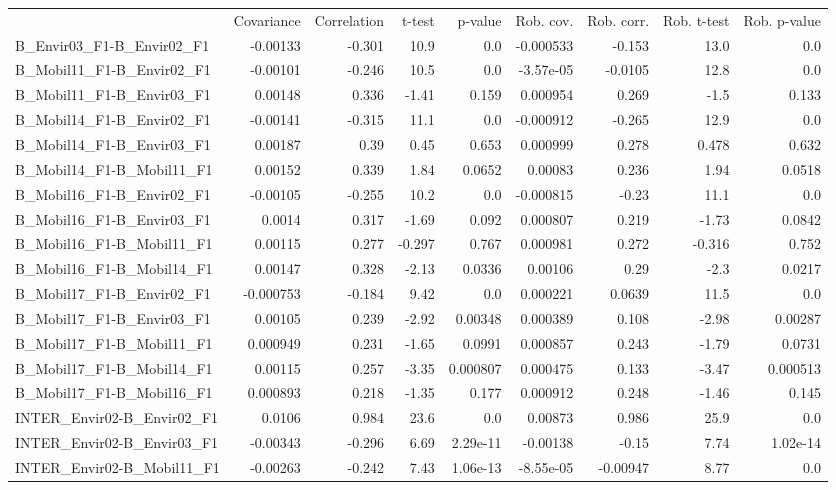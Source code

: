 \begin{tabular}{lrrrrrrrr}
 & Covariance & Correlation & t-test & p-value & Rob. cov. & Rob. corr. & Rob. t-test & Rob. p-value \\
B_Envir03_F1-B_Envir02_F1 & -0.00133 & -0.301 & 10.9 & 0.0 & -0.000533 & -0.153 & 13.0 & 0.0 \\
B_Mobil11_F1-B_Envir02_F1 & -0.00101 & -0.246 & 10.5 & 0.0 & -3.57e-05 & -0.0105 & 12.8 & 0.0 \\
B_Mobil11_F1-B_Envir03_F1 & 0.00148 & 0.336 & -1.41 & 0.159 & 0.000954 & 0.269 & -1.5 & 0.133 \\
B_Mobil14_F1-B_Envir02_F1 & -0.00141 & -0.315 & 11.1 & 0.0 & -0.000912 & -0.265 & 12.9 & 0.0 \\
B_Mobil14_F1-B_Envir03_F1 & 0.00187 & 0.39 & 0.45 & 0.653 & 0.000999 & 0.278 & 0.478 & 0.632 \\
B_Mobil14_F1-B_Mobil11_F1 & 0.00152 & 0.339 & 1.84 & 0.0652 & 0.00083 & 0.236 & 1.94 & 0.0518 \\
B_Mobil16_F1-B_Envir02_F1 & -0.00105 & -0.255 & 10.2 & 0.0 & -0.000815 & -0.23 & 11.1 & 0.0 \\
B_Mobil16_F1-B_Envir03_F1 & 0.0014 & 0.317 & -1.69 & 0.092 & 0.000807 & 0.219 & -1.73 & 0.0842 \\
B_Mobil16_F1-B_Mobil11_F1 & 0.00115 & 0.277 & -0.297 & 0.767 & 0.000981 & 0.272 & -0.316 & 0.752 \\
B_Mobil16_F1-B_Mobil14_F1 & 0.00147 & 0.328 & -2.13 & 0.0336 & 0.00106 & 0.29 & -2.3 & 0.0217 \\
B_Mobil17_F1-B_Envir02_F1 & -0.000753 & -0.184 & 9.42 & 0.0 & 0.000221 & 0.0639 & 11.5 & 0.0 \\
B_Mobil17_F1-B_Envir03_F1 & 0.00105 & 0.239 & -2.92 & 0.00348 & 0.000389 & 0.108 & -2.98 & 0.00287 \\
B_Mobil17_F1-B_Mobil11_F1 & 0.000949 & 0.231 & -1.65 & 0.0991 & 0.000857 & 0.243 & -1.79 & 0.0731 \\
B_Mobil17_F1-B_Mobil14_F1 & 0.00115 & 0.257 & -3.35 & 0.000807 & 0.000475 & 0.133 & -3.47 & 0.000513 \\
B_Mobil17_F1-B_Mobil16_F1 & 0.000893 & 0.218 & -1.35 & 0.177 & 0.000912 & 0.248 & -1.46 & 0.145 \\
INTER_Envir02-B_Envir02_F1 & 0.0106 & 0.984 & 23.6 & 0.0 & 0.00873 & 0.986 & 25.9 & 0.0 \\
INTER_Envir02-B_Envir03_F1 & -0.00343 & -0.296 & 6.69 & 2.29e-11 & -0.00138 & -0.15 & 7.74 & 1.02e-14 \\
INTER_Envir02-B_Mobil11_F1 & -0.00263 & -0.242 & 7.43 & 1.06e-13 & -8.55e-05 & -0.00947 & 8.77 & 0.0 \\

\end{tabular}
